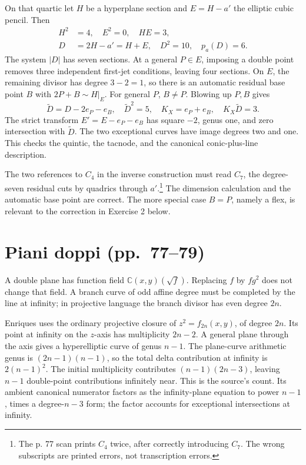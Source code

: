 On that quartic let \(H\) be a hyperplane section and \(E=H-a'\) the elliptic cubic pencil. Then \[
\begin{aligned}
H^2&=4,\quad E^2=0,\quad HE=3,\\
D&=2H-a'=H+E,\quad D^2=10,\quad p_a(D)=6.
\end{aligned}
\] The system \(|D|\) has seven sections. At a general \(P\in E\), imposing a double point removes three independent first-jet conditions, leaving four sections. On \(E\), the remaining divisor has degree \(3-2=1\), so there is an automatic residual base point \(B\) with \(2P+B\sim H|_E\). For general \(P\), \(B\ne P\). Blowing up \(P,B\) gives \[
\widetilde D=D-2e_P-e_B,\quad
\widetilde D^2=5,\quad
K_X=e_P+e_B,\quad K_X\widetilde D=3.
\] The strict transform \(E'=E-e_P-e_B\) has square \(-2\), genus one, and zero intersection with \(\widetilde D\). The two exceptional curves have image degrees two and one. This checks the quintic, the tacnode, and the canonical conic-plus-line description.

The two references to \(C_4\) in the inverse construction must read \(C_7\), the degree-seven residual cuts by quadrics through \(a'\).\footnote{The p. 77 scan prints \(C_4\) twice, after correctly introducing \(C_7\). The wrong subscripts are printed errors, not transcription errors.} The dimension calculation and the automatic base point are correct. The more special case \(B=P\), namely a flex, is relevant to the correction in Exercise 2 below.

\section[Piani doppi]{Piani doppi (pp.~77--79)}\label{commentary-III-8}

A double plane has function field \(\mathbb{C}(x,y)(\sqrt f)\). Replacing \(f\) by \(f g^2\) does not change that field. A branch curve of odd affine degree must be completed by the line at infinity; in projective language the branch divisor has even degree \(2n\).

Enriques uses the ordinary projective closure of \(z^2=f_{2n}(x,y)\), of degree \(2n\). Its point at infinity on the \(z\)-axis has multiplicity \(2n-2\). A general plane through the axis gives a hyperelliptic curve of genus \(n-1\). The plane-curve arithmetic genus is \((2n-1)(n-1)\), so the total delta contribution at infinity is \(2(n-1)^2\). The initial multiplicity contributes \((n-1)(2n-3)\), leaving \(n-1\) double-point contributions infinitely near. This is the source's count. Its ambient canonical numerator factors as the infinity-plane equation to power \(n-1\), times a degree-\(n-3\) form; the factor accounts for exceptional intersections at infinity.

